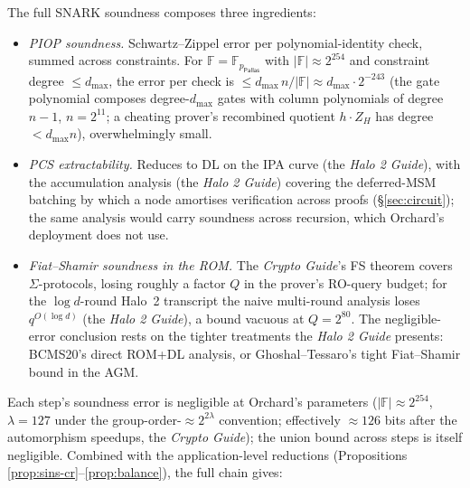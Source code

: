 \documentclass[11pt,a4paper]{article}
\theoremstyle{definition}
\newcommand{\F}{\mathbb{F}}
\newcommand{\Pallas}{\ensuremath{\mathsf{Pallas}}}
\begin{document}
The full SNARK soundness composes three ingredients:
\begin{itemize}[leftmargin=*]
\item \emph{PIOP soundness.} Schwartz--Zippel error per polynomial-identity
check, summed across constraints. For $\F = \F_{p_{\Pallas}}$ with
$|\F| \approx 2^{254}$ and constraint degree $\le d_{\max}$, the error
per check is $\le d_{\max}\, n / |\F| \approx d_{\max} \cdot 2^{-243}$
(the gate polynomial composes degree-$d_{\max}$ gates with column
polynomials of degree $n-1$, $n = 2^{11}$; a cheating prover's recombined
quotient $h \cdot Z_H$ has degree $< d_{\max} n$), overwhelmingly small.
\item \emph{PCS extractability.} Reduces to DL on the IPA curve
(the \emph{Halo 2 Guide}), with the accumulation analysis
(the \emph{Halo 2 Guide}) covering the deferred-MSM batching by which a
node amortises verification across proofs (\S\ref{sec:circuit}); the same
analysis would carry soundness across recursion, which Orchard's
deployment does not use.
\item \emph{Fiat--Shamir soundness in the ROM.} The \emph{Crypto Guide}'s
FS theorem covers $\Sigma$-protocols, losing roughly a factor $Q$ in the
prover's RO-query budget; for the $\log d$-round Halo~2 transcript the
naive multi-round analysis loses $q^{O(\log d)}$ (the \emph{Halo 2
Guide}), a bound vacuous at $Q = 2^{80}$. The negligible-error conclusion
rests on the tighter treatments the \emph{Halo 2 Guide} presents:
BCMS20's direct ROM+DL analysis, or Ghoshal--Tessaro's tight Fiat--Shamir
bound in the AGM.
\end{itemize}

Each step's soundness error is negligible at Orchard's parameters
($|\F| \approx 2^{254}$, $\lambda = 127$ under the
group-order-$\approx 2^{2\lambda}$ convention; effectively $\approx 126$
bits after the automorphism speedups, the \emph{Crypto Guide}); the union
bound across steps is itself negligible. Combined with the application-level reductions
(Propositions \ref{prop:sins-cr}--\ref{prop:balance}), the full chain
gives:
\end{document}
